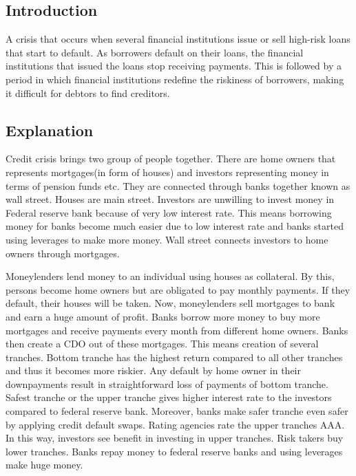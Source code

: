 \documentclass[11pt]{article}
\numberwithin{equation}{section}
\begin{document}
\subsection{Introduction}\medskip

A crisis that occurs when several financial institutions issue or sell high-risk loans that start to default. As borrowers default on their loans, the financial institutions that issued the loans stop receiving payments. This is followed by a period in which financial institutions redefine the riskiness of borrowers, making it difficult for debtors to find creditors. 

\subsection{Explanation}\medskip

Credit crisis brings two group of people together. There are home owners that represents mortgages(in form of houses) and investors representing money in terms of pension funds etc. They are connected through banks together known as wall street. Houses are main street. Investors are unwilling to invest money in Federal reserve bank because of very low interest rate. This means borrowing money for banks become much easier due to low interest rate and banks started using leverages to make more money. Wall street connects investors to home owners through mortgages.\medskip
 
\hspace{1cm}Moneylenders lend money to an individual using houses as collateral. By this, persons become home owners but are obligated to pay monthly payments. If they default, their houses will be taken. Now, moneylenders sell mortgages to bank and earn a huge amount of profit. Banks borrow more money to buy more mortgages and receive payments every month from different home owners. Banks then create a CDO out of these mortgages. This means creation of several tranches. Bottom tranche has the highest return compared to all other tranches and thus it becomes more riskier. Any default by home owner in their downpayments result in straightforward loss of payments of bottom tranche. Safest tranche or the upper tranche gives higher interest rate to the investors compared to federal reserve bank. Moreover, banks make safer tranche even safer by applying credit default swaps. Rating agencies rate the upper tranches AAA. In this way, investors see benefit in investing in upper tranches. Risk takers buy lower tranches. Banks repay money to federal reserve banks and using leverages make huge money. \medskip
\end{document}
